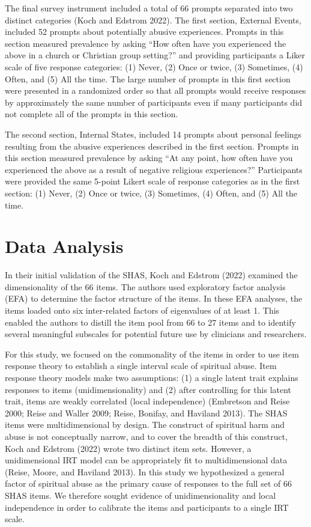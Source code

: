 \documentclass[
  letterpaper,
  DIV=11,
  numbers=noendperiod]{scrreport}
\begin{document}
The final survey instrument included a total of 66 prompts separated
into two distinct categories (Koch and Edstrom 2022). The first section,
External Events, included 52 prompts about potentially abusive
experiences. Prompts in this section measured prevalence by asking ``How
often have you experienced the above in a church or Christian group
setting?'' and providing participants a Liker scale of five response
categories: (1) Never, (2) Once or twice, (3) Sometimes, (4) Often, and
(5) All the time. The large number of prompts in this first section were
presented in a randomized order so that all prompts would receive
responses by approximately the same number of participants even if many
participants did not complete all of the prompts in this section.

The second section, Internal States, included 14 prompts about personal
feelings resulting from the abusive experiences described in the first
section. Prompts in this section measured prevalence by asking ``At any
point, how often have you experienced the above as a result of negative
religious experiences?'' Participants were provided the same 5-point
Likert scale of response categories as in the first section: (1) Never,
(2) Once or twice, (3) Sometimes, (4) Often, and (5) All the time.

\hypertarget{data-analysis}{%
\section*{Data Analysis}\label{data-analysis}}

In their initial validation of the SHAS, Koch and Edstrom (2022)
examined the dimensionality of the 66 items. The authors used
exploratory factor analysis (EFA) to determine the factor structure of
the items. In these EFA analyses, the items loaded onto six
inter-related factors of eigenvalues of at least 1. This enabled the
authors to distill the item pool from 66 to 27 items and to identify
several meaningful subscales for potential future use by clinicians and
researchers.

For this study, we focused on the commonality of the items in order to
use item response theory to establish a single interval scale of
spiritual abuse. Item response theory models make two assumptions: (1) a
single latent trait explains responses to items (unidimensionality) and
(2) after controlling for this latent trait, items are weakly correlated
(local independence) (Embretson and Reise 2000; Reise and Waller 2009;
Reise, Bonifay, and Haviland 2013). The SHAS items were multidimensional
by design. The construct of spiritual harm and abuse is not conceptually
narrow, and to cover the breadth of this construct, Koch and Edstrom
(2022) wrote two distinct item sets. However, a unidimensional IRT model
can be appropriately fit to multidimensional data (Reise, Moore, and
Haviland 2013). In this study we hypothesized a general factor of
spiritual abuse as the primary cause of responses to the full set of 66
SHAS items. We therefore sought evidence of unidimensionality and local
independence in order to calibrate the items and participants to a
single IRT scale.
\end{document}
